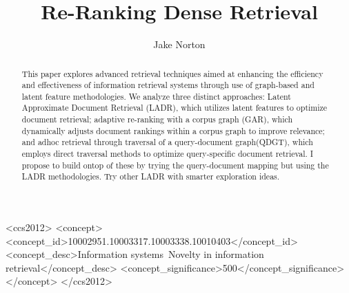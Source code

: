 \documentclass[sigconf,authorversion,nonacm]{acmart}
\begin{document}
\title{Re-Ranking Dense Retrieval}
\author{Jake Norton}



\begin{abstract}
	This paper explores advanced retrieval techniques aimed at enhancing the efficiency
	and effectiveness of information retrieval systems through use of graph-based and
	latent feature methodologies. We analyze three distinct approaches: Latent Approximate Document
	Retrieval (LADR)\cite{ladr}, which utilizes latent features to optimize document retrieval; adaptive
	re-ranking with a corpus graph (GAR)\cite{gar}, which dynamically adjusts document rankings within a
	corpus graph to improve relevance; and adhoc retrieval through traversal of a query-document
	graph(QDGT)\cite{query-document}, which employs direct traversal methods to optimize query-specific document retrieval. I
	propose to build ontop of these by trying the query-document mapping but using the LADR
	methodologies. Try other LADR with smarter exploration ideas.


\end{abstract}


\begin{CCSXML} <ccs2012> <concept> <concept_id>10002951.10003317.10003338.10010403</concept_id>
	<concept_desc>Information systems~Novelty in information retrieval</concept_desc>
	<concept_significance>500</concept_significance> </concept> </ccs2012>
\end{CCSXML}


\maketitle
\end{document}
